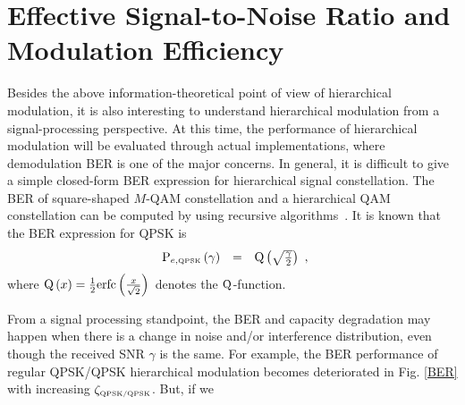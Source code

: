 \documentclass[10pt,fleqn, twocolumn]{IEEEtran}
\begin{document}
\section{Effective Signal-to-Noise Ratio and Modulation Efficiency}
Besides the above information-theoretical point of view of
hierarchical modulation, it is also interesting to understand
hierarchical modulation from a signal-processing perspective. At
this time, the performance of hierarchical modulation will be
evaluated through actual implementations, where demodulation BER
is one of the major concerns. In general, it is difficult to give
a simple closed-form BER expression for hierarchical signal
constellation. The BER of square-shaped $M$-QAM constellation and
a hierarchical QAM constellation can be computed by using
recursive algorithms~\cite{Vitt03}. It is known that the BER
expression for QPSK is
\begin{equation}
\begin{array}{rcl}
{\rm P}_{e,\mbox{\tiny QPSK}}\left(\gamma\right)&=&{\rm
Q}\left(\sqrt{\frac{\gamma}{2}}\right)
\end{array},\label{BER_QPSK}
\end{equation}
\noindent where ${\rm Q}\left(x\right)=\frac{1}{2}{\rm
erfc}\left(\frac{x}{\sqrt{2}}\right)$ denotes the $\rm
Q$-function.
\begin{figure} 
\end{figure}
From a signal processing standpoint, the BER and capacity
degradation may happen when there is a change in noise and/or
interference distribution, even though the received SNR $\gamma$
is the same. For example, the BER performance of regular QPSK/QPSK
hierarchical modulation becomes deteriorated in Fig. \ref{BER}
with increasing $\zeta_{\mbox{\tiny QPSK/QPSK}}$. But, if we
\end{document}
